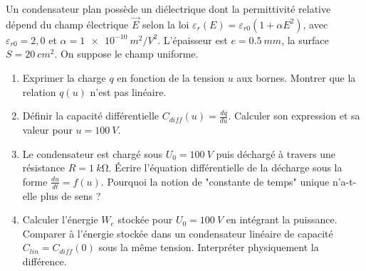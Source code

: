 \documentclass[11pt]{article}
\begin{document}
\begin{exercice}
Un condensateur plan possède un diélectrique dont la permittivité relative dépend du champ électrique $\vec{E}$ selon la loi $\varepsilon_r(E) = \varepsilon_{r0} (1 + \alpha E^2)$, avec $\varepsilon_{r0} = 2,0$ et $\alpha = \SI{1e-10}{m^2/V^2}$. L'épaisseur est $e = \SI{0,5}{mm}$, la surface $S = \SI{20}{cm^2}$. On suppose le champ uniforme.
\begin{enumerate}
    \item Exprimer la charge $q$ en fonction de la tension $u$ aux bornes. Montrer que la relation $q(u)$ n'est pas linéaire.
    \item Définir la capacité différentielle $C_{diff}(u) = \frac{dq}{du}$. Calculer son expression et sa valeur pour $u = \SI{100}{V}$.
    \item Le condensateur est chargé sous $U_0 = \SI{100}{V}$ puis déchargé à travers une résistance $R = \SI{1}{k\ohm}$. Écrire l'équation différentielle de la décharge sous la forme $\frac{du}{dt} = f(u)$. Pourquoi la notion de "constante de temps" unique n'a-t-elle plus de sens ?
    \item Calculer l'énergie $W_e$ stockée pour $U_0 = \SI{100}{V}$ en intégrant la puissance. Comparer à l'énergie stockée dans un condensateur linéaire de capacité $C_{lin} = C_{diff}(0)$ sous la même tension. Interpréter physiquement la différence.
\end{enumerate}
\end{exercice}
\end{document}
